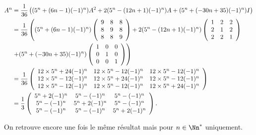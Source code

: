 {{\begin{align*}\ensuremath
A^n&=\frac{1}{36}\left((5^n+(6n-1)(-1)^n)A^2+2(5^n-(12n+1)(-1)^n)A+(5^n+(-30n+35)(-1)^n)I\right)
\\
     &=\frac{1}{36}\left((5^n+(6n-1)(-1)^n)
\left(
\begin{array}{ccc}
9&8&8\\
8&9&8\\
8&8&9
\end{array}
\right)+2(5^n-(12n+1)(-1)^n)\left(
\begin{array}{ccc}
1&2&2\\
2&1&2\\
2&2&1
\end{array}
\right)\right.\\
 &\left.+(5^n+(-30n+35)(-1)^n)\left(
\begin{array}{ccc}
1&0&0\\
0&1&0\\
0&0&1
\end{array}
\right)\right)\\
     &=\frac{1}{36}\left(
\begin{array}{ccc}
12\times5^n+24(-1)^n&12\times5^n-12(-1)^n&12\times5^n-12(-1)^n\\
12\times5^n-12(-1)^n&12\times5^n+24(-1)^n&12\times5^n-12(-1)^n\\
12\times5^n-12(-1)^n&12\times5^n-12(-1)^n&12\times5^n+24(-1)^n
\end{array}
\right)\\
 &=\frac{1}{3}\left(
\begin{array}{ccc}
5^n+2(-1)^n&5^n-(-1)^n&5^n-(-1)^n\\
5^n-(-1)^n&5^n+2(-1)^n&5^n-(-1)^n\\
5^n-(-1)^n&5^n-(-1)^n&5^n+2(-1)^n
\end{array}
\right).
\end{align*}

On retrouve encore une fois le même résultat mais pour $n\in\Nn^*$ uniquement.}
}
